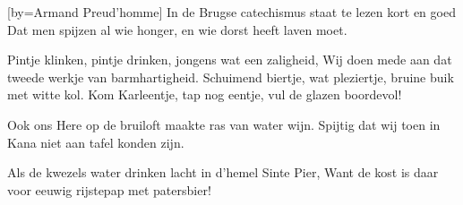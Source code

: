 [by={Armand Preud'homme}]
\beginverse
In de Brugse catechismus
staat te lezen kort en goed
Dat men spijzen al wie honger,
en wie dorst heeft laven moet.
\endverse

\beginchorus
Pintje klinken,
pintje drinken,
jongens wat een zaligheid,
Wij doen mede
aan dat tweede
werkje van barmhartigheid.
Schuimend biertje,
wat pleziertje,
bruine buik met witte kol.
Kom Karleentje,
tap nog eentje,
vul de glazen boordevol!
\endchorus

\beginverse
Ook ons Here op de bruiloft
maakte ras van water wijn.
Spijtig dat wij toen in Kana
niet aan tafel konden zijn.
\endverse

\beginverse
Als de kwezels water drinken
lacht in d'hemel Sinte Pier,
Want de kost is daar voor eeuwig
rijstepap met patersbier!
\endverse
\endsong